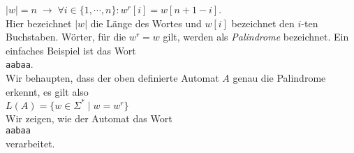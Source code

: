 \hspace*{1.3cm}
$|w| = n \;\rightarrow\; \forall i \in \{1,\cdots,n\}:w^r[i] = w[n + 1 - i]$. 
\\[0.2cm]
Hier bezeichnet $|w|$ die L\"ange des Wortes und $w[i]$ bezeichnet den $i$-ten Buchstaben.
W\"orter, f\"ur die $w^r = w$ gilt, werden als \emph{Palindrome} bezeichnet.
Ein einfaches Beispiel ist das Wort 
\\[0.2cm]
\hspace*{1.3cm}
\texttt{aabaa}.
\\[0.2cm]
Wir behaupten, dass der oben definierte Automat $A$ genau die Palindrome erkennt, es gilt also
\\[0.2cm]
\hspace*{1.3cm}
$L(A) = \{ w \in \Sigma^* \mid w = w^r \}$
\\[0.2cm]
Wir zeigen, wie der Automat das Wort 
\\[0.2cm]
\hspace*{1.3cm}
\texttt{aabaa}
\\[0.2cm]
verarbeitet.

